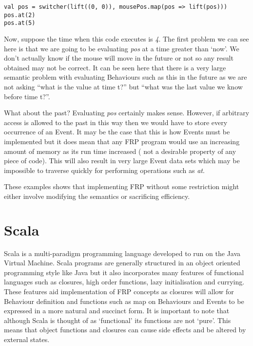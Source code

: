 \documentclass[12pt]{article}
\begin{document}
\begin{verbatim}
val pos = switcher(lift((0, 0)), mousePos.map(pos => lift(pos)))
pos.at(2)
pos.at(5)
\end{verbatim}    

      Now, suppose the time when this code executes is \emph{4}. The first problem we can see here
      is that we are going to be evaluating \emph{pos} at a time greater than `now'. We don't
      actually know if the mouse will move in the future or not so any result obtained may not
      be correct. It can be seen here that there is a very large semantic problem with evaluating
      Behaviours such as this in the future as we are not asking ``what is the value at time t?''
      but ``what was the last value we know before time t?''. 
      
      What about the past? Evaluating \emph{pos} certainly makes sense. However, if arbitrary
      access is allowed to the past in this way then we would have to store every occurrence
      of an Event. It may be the case that this is how Events must be implemented but it does
      mean that any FRP program would use an increasing amount of memory as its run time increased (
      not a desirable property of any piece of code). This will also result in very large Event data sets which
      may be impossible to traverse quickly for performing operations such as \emph{at}.
      
      These examples shows that implementing FRP without some restriction might either involve modifying the
      semantics or sacrificing efficiency.
 
  \section{Scala}
    Scala is a multi-paradigm programming language developed to run on the Java Virtual Machine. Scala programs are
    generally structured in an object oriented programming style like Java but it also incorporates many features of
    functional languages such as closures, high order functions, lazy initialisation and currying. These features aid
    implementation of FRP concepts as closures will allow for Behaviour definition and functions such as map on
    Behaviours and Events to be expressed in a more natural and succinct form. It is
    important to note that although Scala is thought of as `functional' its functions are not `pure'. This means
    that object functions and closures can cause side effects and be altered by external states.
\end{document}

